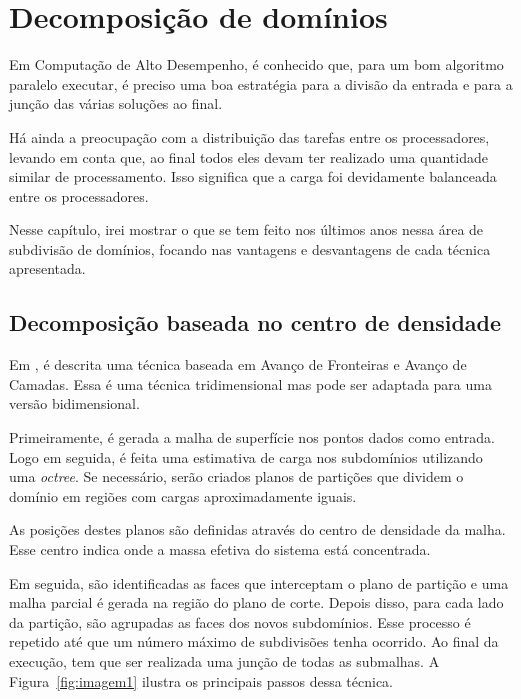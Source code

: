 \pagestyle{empty}
\cleardoublepage
\pagestyle{fancy}
\chapter{Decomposição de domínios}\label{cap2}

Em Computação de Alto Desempenho, é conhecido que, para um bom algoritmo paralelo executar, é preciso uma boa estratégia para a divisão da entrada e para a junção das várias soluções ao final. 

Há ainda a preocupação com a distribuição das tarefas entre os processadores, levando em conta que, ao final todos eles devam ter realizado uma quantidade similar de processamento. Isso significa que a carga foi devidamente balanceada entre os processadores.

Nesse capítulo, irei mostrar o que se tem feito nos últimos anos nessa área de subdivisão de domínios, focando nas vantagens e desvantagens de cada técnica apresentada.


\section{Decomposição baseada no centro de densidade}

Em \cite{bib:Pirzadeh09}, é descrita uma técnica baseada em Avanço de Fronteiras e Avanço de Camadas. Essa é uma técnica tridimensional mas pode ser adaptada para uma versão bidimensional.

Primeiramente, é gerada a malha de superfície nos pontos dados como entrada. Logo em seguida, é feita uma estimativa de carga nos subdomínios utilizando uma \textit{octree}. Se necessário, serão criados planos de partições que dividem o domínio em regiões com cargas aproximadamente iguais. 

As posições destes planos são definidas através do centro de densidade da malha. Esse centro indica onde a massa efetiva do sistema está concentrada.

Em seguida, são identificadas as faces que interceptam o plano de partição e uma malha parcial é gerada na região do plano de corte. Depois disso, para cada lado da partição, são agrupadas as faces dos novos subdomínios. Esse processo é repetido até que um número máximo de subdivisões tenha ocorrido. Ao final da execução, tem que ser realizada uma junção de todas as submalhas. A Figura~\ref{fig:imagem1} ilustra os principais passos dessa técnica.

